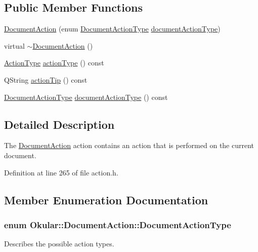 \subsection*{Public Member Functions}
\begin{DoxyCompactItemize}
\item 
\hyperlink{classOkular_1_1DocumentAction_a958fc4f1bc8e9f01a198394151082241}{Document\+Action} (enum \hyperlink{classOkular_1_1DocumentAction_a59b262b16719b9b55005d7c143f9415d}{Document\+Action\+Type} \hyperlink{classOkular_1_1DocumentAction_ab08e1e40bf9d37fc7e91b4515a6296d9}{document\+Action\+Type})
\item 
virtual \hyperlink{classOkular_1_1DocumentAction_a73cd26e37ce86c968b47dfc1d70bb74c}{$\sim$\+Document\+Action} ()
\item 
\hyperlink{classOkular_1_1Action_abe474735af30ea76105595533df9ec47}{Action\+Type} \hyperlink{classOkular_1_1DocumentAction_aba0ec16ee587e516bbeff8d55d958b47}{action\+Type} () const 
\item 
Q\+String \hyperlink{classOkular_1_1DocumentAction_a351e6e44a53442df6d0ccf48b83aa697}{action\+Tip} () const 
\item 
\hyperlink{classOkular_1_1DocumentAction_a59b262b16719b9b55005d7c143f9415d}{Document\+Action\+Type} \hyperlink{classOkular_1_1DocumentAction_ab08e1e40bf9d37fc7e91b4515a6296d9}{document\+Action\+Type} () const 
\end{DoxyCompactItemize}


\subsection{Detailed Description}
The \hyperlink{classOkular_1_1DocumentAction}{Document\+Action} action contains an action that is performed on the current document. 

Definition at line 265 of file action.\+h.



\subsection{Member Enumeration Documentation}
\hypertarget{classOkular_1_1DocumentAction_a59b262b16719b9b55005d7c143f9415d}{
\subsubsection[{Document\+Action\+Type}]{\setlength{\rightskip}{0pt plus 5cm}enum {\bf Okular\+::\+Document\+Action\+::\+Document\+Action\+Type}}}\label{classOkular_1_1DocumentAction_a59b262b16719b9b55005d7c143f9415d}
Describes the possible action types.

